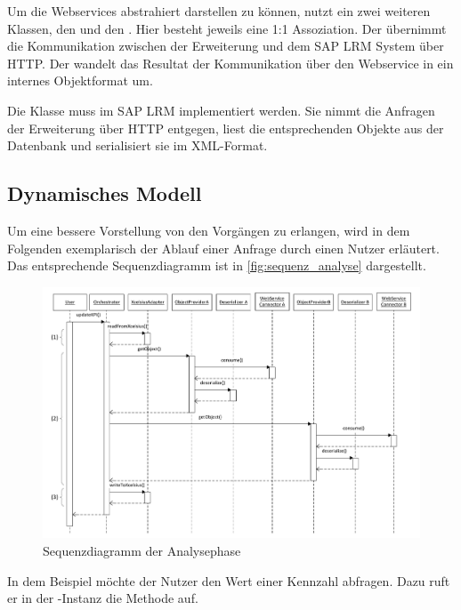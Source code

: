 \begin{onehalfspacing}
Um die Webservices abstrahiert darstellen zu können, nutzt ein  zwei weiteren Klassen, den  und den . Hier besteht jeweils eine 1:1 Assoziation. Der  übernimmt die Kommunikation zwischen der Erweiterung und dem SAP LRM System über \gls{HTTP}. Der  wandelt das Resultat der Kommunikation über den Webservice in ein internes Objektformat um.

Die Klasse  muss im SAP LRM implementiert werden. Sie nimmt die Anfragen der Erweiterung über \gls{HTTP} entgegen, liest die entsprechenden Objekte aus der Datenbank und serialisiert sie im \gls{XML}-Format.

\subsection{Dynamisches Modell}
Um eine bessere Vorstellung von den Vorgängen zu erlangen, wird in dem Folgenden exemplarisch der Ablauf einer Anfrage durch einen Nutzer erläutert. Das entsprechende Sequenzdiagramm ist in \vref{fig:sequenz_analyse} dargestellt.

\begin{figure}[h]
\centering
\setlength{\unitlength}{1mm}
\includegraphics[width=15cm]{Visio/Analyse-Sequenz.pdf}
\caption{Sequenzdiagramm der Analysephase \label{fig:sequenz_analyse}}
\end{figure} 


In dem Beispiel möchte der Nutzer den Wert einer Kennzahl abfragen. Dazu ruft er in der -Instanz die Methode  auf.


\end{onehalfspacing}
